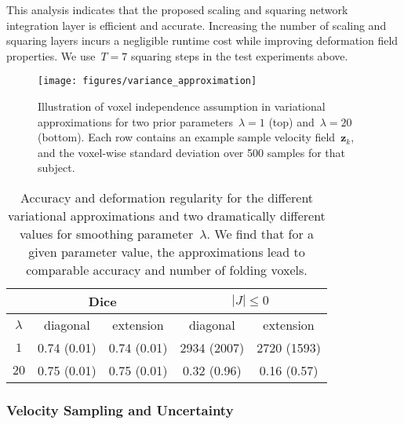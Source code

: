 \documentclass{article}
\newcommand{\bz}{\boldsymbol{z}}
\begin{document}
	This analysis indicates that the proposed scaling and squaring network integration layer is efficient and accurate. Increasing the number of scaling and squaring layers incurs a negligible runtime cost while improving deformation field properties. We use~$T=7$ squaring steps in the test experiments above.
	







\begin{figure}[t!]
\texttt{[image: figures/variance\_approximation]}
\caption{Illustration of voxel independence assumption in variational approximations for two prior parameters~$\lambda=1$ (top) and~$\lambda=20$ (bottom). Each row contains an example sample velocity field~$\bz_k$, and the voxel-wise standard deviation over 500 samples for that subject.}
	\label{fig:smooth_approximation}
\end{figure}











\begin{table}[!t]
		\vspace{-0.1cm}
		\small
	\begin{tabular}{c | c  c | c c}
		& \multicolumn{2}{c|}{Dice}   & \multicolumn{2}{c}{$|J| \le 0$} \\
		\hline
		$\lambda$ & diagonal  & extension & diagonal  & extension \\
		\hline
		$1$ & 0.74 (0.01) & 0.74 (0.01) & 2934 (2007) & 2720 (1593) \\
		$20$ & 0.75 (0.01) & 0.75 (0.01) & 0.32 (0.96) & 0.16 (0.57) \\
		\hline
	\end{tabular}
\vspace{0.1cm}
	\caption{Accuracy and deformation regularity for the different variational approximations and two dramatically different values for smoothing parameter~$\lambda$. We find that for a given parameter value, the approximations lead to comparable accuracy and number of folding voxels.}
	\label{tab:smooth_approximation}
\end{table}


\vfill


\subsubsection{Velocity Sampling and Uncertainty}
\end{document}
